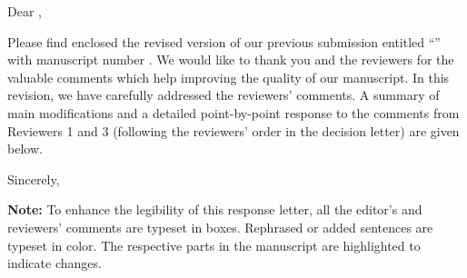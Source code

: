 Dear \editorname,

Please find enclosed the revised version of our previous submission entitled \enquote{\thetitle} with manuscript number \manuscript. We would like to thank you and the reviewers for the valuable comments which help improving the quality of our manuscript.
In this revision, we have carefully addressed the reviewers' comments. A summary of main modifications and a detailed point-by-point response to the comments from Reviewers 1 and 3 (following the reviewers' order in the decision letter) are given below.

\vspace{1.2em}

Sincerely,

\vspace{1.5em}

\theauthor

\vfil
\textbf{Note:} To enhance the legibility of this response letter, all the editor's and reviewers' comments are typeset in boxes. Rephrased or added sentences are typeset in color. The respective parts in the manuscript are highlighted to indicate changes.